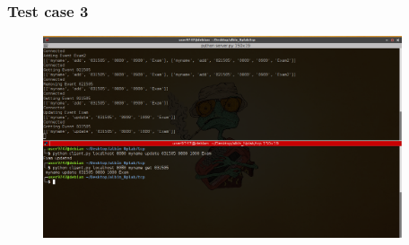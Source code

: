 \documentclass{article}
\begin{document}
\subsubsection{Test case 3}
 \begin{figure}[H]
\centering
\includegraphics[width=400]{img/cal3.png}
\end{figure}
  
  
  
\end{document}
